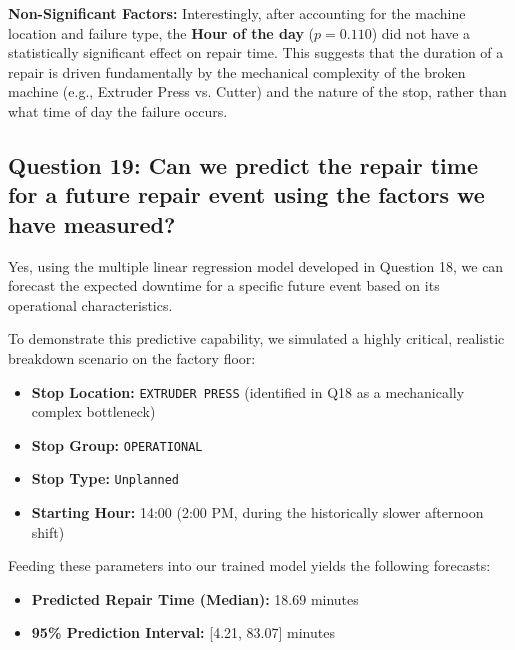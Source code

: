 \textbf{Non-Significant Factors:}
Interestingly, after accounting for the machine location and failure type, the \textbf{Hour of the day} ($p = 0.110$) did not have a statistically significant effect on repair time. This suggests that the duration of a repair is driven fundamentally by the mechanical complexity of the broken machine (e.g., Extruder Press vs. Cutter) and the nature of the stop, rather than what time of day the failure occurs.

\subsection*{Question 19: Can we predict the repair time for a future repair event using the factors we have measured?}

Yes, using the multiple linear regression model developed in Question 18, we can forecast the expected downtime for a specific future event based on its operational characteristics. 

To demonstrate this predictive capability, we simulated a highly critical, realistic breakdown scenario on the factory floor:
\begin{itemize}
    \item \textbf{Stop Location:} \texttt{EXTRUDER PRESS} (identified in Q18 as a mechanically complex bottleneck)
    \item \textbf{Stop Group:} \texttt{OPERATIONAL}
    \item \textbf{Stop Type:} \texttt{Unplanned}
    \item \textbf{Starting Hour:} 14:00 (2:00 PM, during the historically slower afternoon shift)
\end{itemize}

Feeding these parameters into our trained model yields the following forecasts:
\begin{itemize}
    \item \textbf{Predicted Repair Time (Median):} 18.69 minutes
    \item \textbf{95\% Prediction Interval:} [4.21, 83.07] minutes
\end{itemize}



